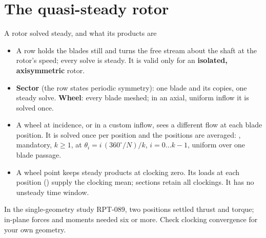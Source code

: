 %
%

\section{The quasi-steady rotor}

\begin{frame}{A rotor solved steady, and what its products are}
\begin{itemize}\small
  \item A  row holds the blades still and turns the free
        stream about the shaft at the rotor's speed; every solve is steady. It
        is valid only for an \textbf{isolated, axisymmetric} rotor.
  \item \textbf{Sector} (the row states periodic symmetry): one blade and its
        copies, one steady solve. \textbf{Wheel}: every blade meshed; in an
        axial, uniform inflow it is solved once.
  \item A wheel at incidence, or in a custom inflow, sees a different flow at
        each blade position. It is solved once per position and the
        positions are averaged: , mandatory,
        \(k \ge 1\), at \(\theta_i = i\,(360^\circ/N)/k\), \(i = 0 \ldots
        k-1\), uniform over one blade passage.
  \item A wheel point keeps steady products at clocking zero. Its loads at
        each position () supply the clocking mean;
        sections retain all clockings. It has no unsteady time window.
\end{itemize}
\begin{takeaway}In the single-geometry study RPT-089, two positions settled
thrust and torque; in-plane forces and moments needed six or more.
Check clocking convergence for your own geometry.\end{takeaway}
\end{frame}

